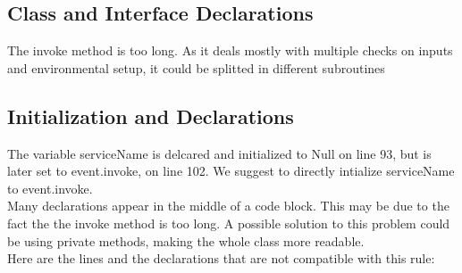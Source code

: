 \documentclass{article}
\begin{document}
\subsection{Class and Interface Declarations}
The invoke method is too long. As it deals mostly with multiple checks on inputs and environmental setup, it could be splitted in different subroutines

\subsection{Initialization and Declarations}
The variable serviceName is delcared and initialized to Null on line 93, but is later set to event.invoke, on line 102. We suggest to directly intialize serviceName to event.invoke.\\
Many declarations appear in the middle of a code block. This may be due to the fact the the invoke method is too long. A possible solution to this problem could be using private methods, making the whole class more readable.\\
Here are the lines and the declarations that are not compatible with this rule:
\end{document}
